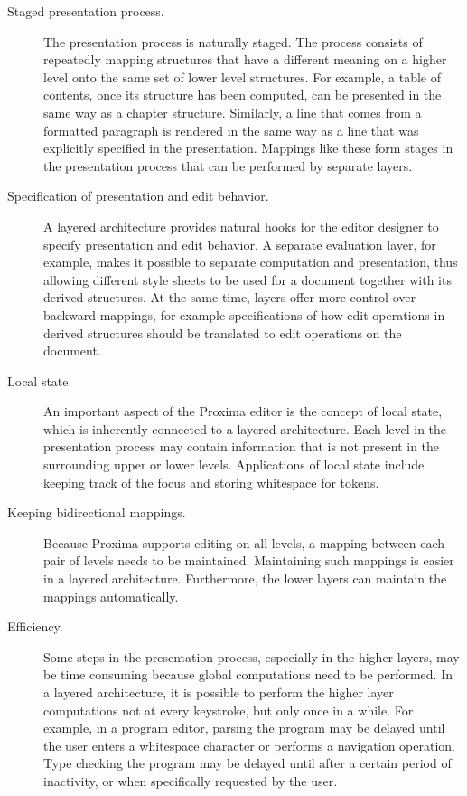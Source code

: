 \begin{description}

\item[Staged presentation process.]
The presentation process is naturally staged. The process consists of repeatedly mapping  structures that have a different meaning on a higher level onto the same set of lower level structures. For example, a table of contents, once its structure has been computed, can be presented in the same way as a chapter structure. Similarly, a line that comes from a formatted paragraph is rendered in the same way as a line that was explicitly specified in the presentation. Mappings like these form stages in the presentation process that can be performed by separate layers.

\item[Specification of presentation and edit behavior.]
A layered architecture provides natural hooks for the editor designer to specify presentation and edit behavior. A separate evaluation layer, for example, makes it possible to separate computation and presentation, thus allowing different style sheets to be used for a document together with its derived structures. At the same time, layers offer more control over backward mappings, for example specifications of how edit operations in derived structures should be translated to edit operations on the document.

\item[Local state.] 
An important aspect of the Proxima editor is the concept of local state, which is inherently connected to a layered architecture. Each level in the presentation process may contain information that is not present in the surrounding upper or lower levels. Applications of local state include keeping track of the focus and storing whitespace for tokens. 

\item[Keeping bidirectional mappings.]
Because Proxima supports editing on all levels, a mapping between each pair of levels needs to be maintained. Maintaining such mappings is easier in a layered architecture. Furthermore, the lower layers can maintain the mappings automatically.

\item[Efficiency.]
Some steps in the presentation process, especially in the higher layers, may be time consuming because global computations need to be performed. In a layered architecture, it is possible to perform the higher layer computations not at every keystroke, but only once in a while. For example, in a program editor, parsing the program may be delayed until the user enters a whitespace character or performs a navigation operation. Type checking the program may be delayed until after a certain period of inactivity, or when specifically requested by the user.
\end{description}

